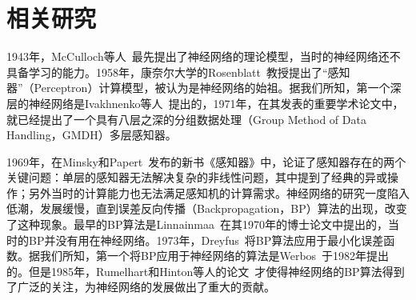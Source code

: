 \section{相关研究}
\label{sec:relate}


1943年，McCulloch等人~\cite{mcculloch1943logical}最先提出了神经网络的理论模型，当时的神经网络还不具备学习的能力。1958年，康奈尔大学的Rosenblatt~\cite{rosenblatt1958perceptron}教授提出了“感知器”（Perceptron）计算模型，被认为是神经网络的始祖。据我们所知，第一个深层的神经网络是Ivakhnenko等人~\cite{ivakhnenko1966cybernetic,ivakhnenko1967cybernetics,ivakhnenko1968group,ivakhnenko1971polynomial}提出的，1971年，在其发表的重要学术论文\cite{ivakhnenko1971polynomial}中，就已经提出了一个具有八层之深的分组数据处理（Group Method of Data Handling，GMDH）多层感知器。%

1969年，在Minsky和Papert~\cite{minsky1969perceptrons}发布的新书《感知器》中，论证了感知器存在的两个关键问题：单层的感知器无法解决复杂的非线性问题，其中提到了经典的异或操作；另外当时的计算能力也无法满足感知机的计算需求。神经网络的研究一度陷入低潮，发展缓慢，直到误差反向传播（Backpropagation，BP）算法的出现，改变了这种现象。最早的BP算法是Linnainmaa~\cite{linnainmaa1970representation,linnainmaa1976taylor}在其1970年的博士论文中提出的，当时的BP并没有用在神经网络。1973年，Dreyfus~\cite{dreyfus1973computational}将BP算法应用于最小化误差函数。据我们所知，第一个将BP应用于神经网络的算法是Werbos~\cite{werbos1982applications}于1982年提出的。但是1985年，Rumelhart和Hinton等人的论文~\cite{rumelhart1985learning}才使得神经网络的BP算法得到了广泛的关注，为神经网络的发展做出了重大的贡献。




